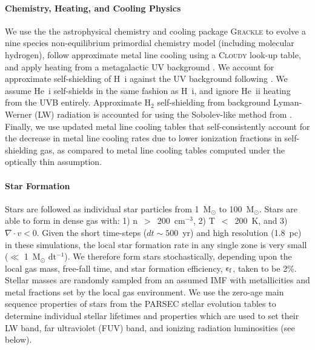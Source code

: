 \documentclass[twocolumn]{aastex61}
\begin{document}
\paragraph{Chemistry, Heating, and Cooling Physics} We use the the astrophysical chemistry and cooling package \textsc{Grackle} \citep{GrackleMethod} to evolve a nine species non-equilibrium primordial chemistry model (including molecular hydrogen), follow approximate metal line cooling using a \textsc{Cloudy} look-up table, and apply heating from a metagalactic UV background \citep{HM2012}. We account for approximate self-shielding of H~{\sc i} against the UV background following \cite{Rahmati2013}. We assume He~{\sc i} self-shields in the same fashion as H~{\sc i}, and ignore He~{\sc ii} heating from the UVB entirely. Approximate H$_2$ self-shielding from background Lyman-Werner (LW) radiation is accounted for using the Sobolev-like method from \cite{Wolcott-Green2011}. Finally, we use updated metal line cooling tables that self-consistently account for the decrease in metal line cooling rates due to lower ionization fractions in self-shielding gas, as compared to metal line cooling tables computed under the optically thin assumption. 

\paragraph{Star Formation} Stars are followed as individual star particles from 1~M$_{\odot}$ to 100~M$_{\odot}$. Stars are able to form in dense gas with: 1) n~$>$~200~cm$^{-3}$, 2) T~$<$~200~K, and 3) $\nabla \cdot v < 0$. Given the short time-steps ($dt \sim 500$~yr) and high resolution (1.8~pc) in these simulations, the local star formation rate in any single zone is very small ($\ll$ 1~M$_{\odot}$ dt$^{-1}$). We therefore form stars stochastically, depending upon the local gas mass, free-fall time, and star formation efficiency, $\epsilon_{\rm f}$, taken to be 2\%. Stellar masses are randomly sampled from an assumed \cite{Salpeter1955} IMF with metallicities and metal fractions set by the local gas environment. We use the zero-age main sequence properties of stars from the \textsc{PARSEC} stellar evolution tables \citep{Bressan2012,Tang2014} to determine individual stellar lifetimes and properties which are used to set their LW band, far ultraviolet (FUV) band, and ionizing radiation luminosities (see below).

\end{document}
